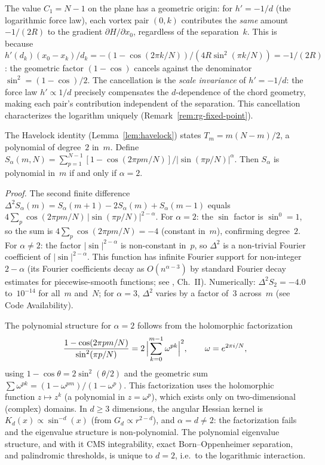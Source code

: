 The value $C_1 = N{-}1$ on the plane has a geometric origin: for
$h' = -1/d$ (the logarithmic force law), each vortex pair $(0,k)$
contributes the \emph{same} amount $-1/(2R)$ to the gradient
$\partial H/\partial x_0$, regardless of the separation~$k$.  This
is because $h'(d_k)(x_0{-}x_k)/d_k = -(1{-}\cos(2\pi k/N))/
(4R\sin^2(\pi k/N)) = -1/(2R)$: the geometric factor
$(1{-}\cos)$ cancels against the denominator $\sin^2 = (1{-}\cos)/2$.
The cancellation is the \emph{scale invariance} of $h' = -1/d$:
the force law $h' \propto 1/d$ precisely compensates the
$d$-dependence of the chord geometry, making each pair's contribution
independent of the separation.  This cancellation characterizes the
logarithm uniquely (Remark~\ref{rem:rg-fixed-point}).

\begin{remark}[Polynomial eigenvalues are unique to $d = 2$]
\label{rmk:polynomial-uniqueness}
The Havelock identity (Lemma~\ref{lem:havelock}) states
$T_m = m(N{-}m)/2$, a polynomial of degree~$2$ in~$m$.
Define $S_\alpha(m,N) = \sum_{p=1}^{N-1}[1{-}\cos(2\pi pm/N)]
/|\!\sin(\pi p/N)|^\alpha$.
Then $S_\alpha$ is polynomial in~$m$ if and only if $\alpha = 2$.

\emph{Proof.}
The second finite difference
$\Delta^2 S_\alpha(m) = S_\alpha(m{+}1) - 2S_\alpha(m) + S_\alpha(m{-}1)$
equals $4\!\sum_p\cos(2\pi pm/N)\,|\!\sin(\pi p/N)|^{2-\alpha}$.
For $\alpha = 2$: the $\sin$ factor is $\sin^0 = 1$, so the sum
is $4\!\sum_p\cos(2\pi pm/N) = -4$ (constant in~$m$), confirming
degree~$2$.
For $\alpha \ne 2$: the factor $|\!\sin|^{2-\alpha}$ is
non-constant in~$p$, so $\Delta^2$ is a non-trivial Fourier
coefficient of $|\!\sin|^{2-\alpha}$.
This function has infinite Fourier support for non-integer
$2{-}\alpha$ (its Fourier coefficients decay as
$O(n^{\alpha-3})$ by standard Fourier decay estimates
for piecewise-smooth functions;
see \citealt{Katznelson2004}, Ch.~II).
Numerically: $\Delta^2 S_2 = -4.0$ to~$10^{-14}$ for all~$m$
and~$N$; for $\alpha = 3$, $\Delta^2$ varies by a factor
of~$3$ across~$m$ (see Code Availability).

The polynomial structure for $\alpha = 2$ follows from
the holomorphic factorization
\begin{equation}\label{eq:holomorphic-factorization}
  \frac{1 - \cos(2\pi pm/N)}{\sin^2(\pi p/N)}
  = 2\,\Bigl|\sum_{k=0}^{m-1}\omega^{pk}\Bigr|^2,
  \qquad \omega = e^{2\pi i/N},
\end{equation}
using $1 - \cos\theta = 2\sin^2(\theta/2)$ and the
geometric sum $\sum\omega^{pk} = (1{-}\omega^{pm})/(1{-}\omega^p)$.
This factorization uses the holomorphic function
$z \mapsto z^k$ (a polynomial in $z = \omega^p$),
which exists only on two-dimensional (complex) domains.
In $d \ge 3$ dimensions, the angular Hessian kernel is
$K_d(x) \propto \sin^{-d}(x)$ (from $G_d \propto r^{2-d}$),
and $\alpha = d \ne 2$: the factorization fails and
the eigenvalue structure is non-polynomial.
The polynomial eigenvalue structure, and with it CMS
integrability, exact Born--Oppenheimer separation, and
palindromic thresholds, is unique to $d = 2$,
i.e.\ to the logarithmic interaction.
\end{remark}

